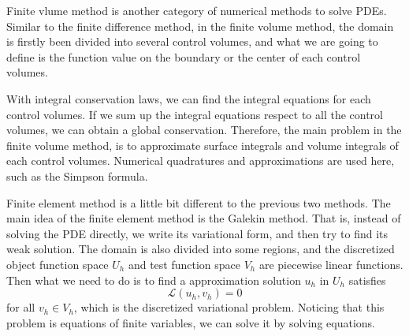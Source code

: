 \documentclass[english, nochinese]{pkupaper}
\begin{document}
Finite vlume method is another category of numerical methods to solve PDEs. Similar to the finite difference method, in the finite volume method, the domain is firstly been divided into several control volumes, and what we are going to define is the function value on the boundary or the center of each control volumes.

With integral conservation laws, we can find the integral equations for each control volumes. If we sum up the integral equations respect to all the control volumes, we can obtain a global conservation. Therefore, the main problem in the finite volume method, is to approximate surface integrals and volume integrals of each control volumes. Numerical quadratures and approximations are used here, such as the Simpson formula.


Finite element method is a little bit different to the previous two methods. The main idea of the finite element method is the Galekin method. That is, instead of solving the PDE directly, we write its variational form, and then try to find its weak solution. The domain is also divided into some regions, and the discretized object function space $U_h$ and test function space $V_h$ are piecewise linear functions. Then what we need to do is to find a approximation solution $u_h$ in $U_h$ satisfies
\begin{equation}
\mathcal{L}(u_h, v_h) = 0
\end{equation}
for all $ v_h \in V_h $, which is the discretized variational problem. Noticing that this problem is equations of finite variables, we can solve it by solving equations.
\end{document}
